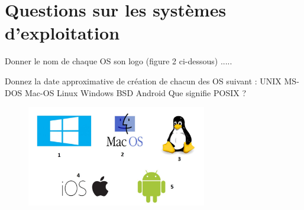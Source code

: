 \documentclass[a4paper,12pt]{exam}
\begin{document}
\section{Questions sur les systèmes d'exploitation}
\begin{questions}
\question Donner le nom de chaque OS son logo (figure 2 ci-dessous)
		.\fillin[][10cm]
		.\fillin[][10cm]
		.\fillin[][10cm]
		.\fillin[][10cm]
		.\fillin[][10cm]
		
	\question Donnez la date approximative de création de chacun des OS suivant :
	\newline
	UNIX     \fillin[][10cm]
	\newline
	MS-DOS\fillin[][9.7cm]
	\newline
	Mac-OS \fillin[][9.8cm]
	\newline
	Linux \fillin[][10.2cm]
	\newline
	Windows \fillin[][9.6cm]
	\newline
	BSD \fillin[][10.4cm]
	\newline
	Android \fillin[][9.8cm]
	\question Que signifie POSIX ?
	\makeemptybox{3cm}
	\begin{figure}[h]
	\centering
	\includegraphics[width = 0.7\textwidth]{os.jpg}
	\caption{}
\end{figure}

\end{questions}
\end{document}
